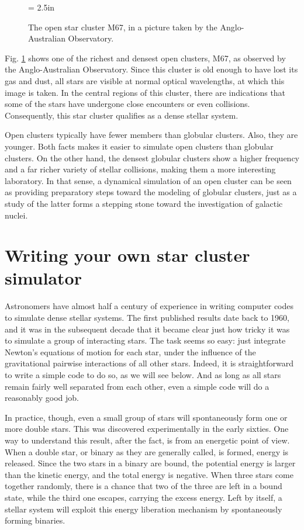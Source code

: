 \begin{figure}[ht]
\begin{center}
\epsfxsize = 2.5in
\caption[The open star cluster M67]
{The open star cluster M67, in a picture taken by the Anglo-Australian
Observatory.}
\label{fig:m67}
\end{center}
\end{figure}

Fig. \ref{fig:m67} shows one of the richest and densest open clusters,
M67, as observed by the Anglo-Australian Observatory.  Since this
cluster is old enough to have lost its gas and dust, all stars are
visible at normal optical wavelengths, at which this image is taken.
In the central regions of this cluster, there are indications that
some of the stars have undergone close encounters or even collisions.
Consequently, this star cluster qualifies as a dense stellar system.

Open clusters typically have fewer members than globular clusters.
Also, they are younger.  Both facts makes it easier to simulate open
clusters than globular clusters.  On the other hand, the densest
globular clusters show a higher frequency and a far richer variety of
stellar collisions, making them a more interesting laboratory.  In
that sense, a dynamical simulation of an open cluster can be seen as
providing preparatory steps toward the modeling of globular clusters,
just as a study of the latter forms a stepping stone toward the
investigation of galactic nuclei.

\section{Writing your own star cluster simulator}

Astronomers have almost half a century of experience in writing
computer codes to simulate dense stellar systems.  The first published
results date back to 1960, and it was in the subsequent decade that it
became clear just how tricky it was to simulate a group of interacting
stars.  The task seems so easy: just integrate Newton's equations of
motion for each star, under the influence of the gravitational pairwise
interactions of all other stars.  Indeed, it is straightforward to
write a simple code to do so, as we will see below.  And as long as
all stars remain fairly well separated from each other, even a simple
code will do a reasonably good job.

In practice, though, even a small group of stars will spontaneously
form one or more double stars.  This was discovered experimentally in
the early sixties.  One way to understand this result, after the fact,
is from an energetic point of view.  When a double star, or binary as they
are generally called, is formed, energy is released.  Since the two stars
in a binary are bound, the potential energy is larger than the kinetic
energy, and the total energy is negative.  When three stars come together
randomly, there is a chance that two of the three are left in a bound
state, while the third one escapes, carrying the excess energy.  Left
by itself, a stellar system will exploit this energy liberation
mechanism by spontaneously forming binaries.

